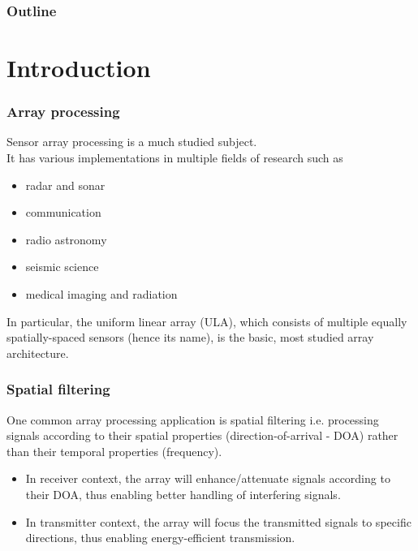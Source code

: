 \documentclass[10pt,pdflatex,headrule,landscape]{beamer}
\institute[SFU]{
Department of Electrical Engineering \\
Technion - Israel Institute of Technology \\
Technion City, Haifa 3200003, Israel
}
\date[]
\begin{document}
\begin{frame}
  \titlepage
\end{frame}

\begin{frame}
  \frametitle{Outline}
  \tableofcontents[hideallsubsections]
\end{frame}

\setlength{\parskip}{1em}

\section{Introduction}

\begin{frame}
\frametitle{Array processing}
Sensor array processing is a much studied subject.
\\
It has various implementations in multiple fields of research such as 
\begin{itemize}
 \item radar and sonar
 \item communication
 \item radio astronomy
 \item seismic science
 \item medical imaging and radiation
\end{itemize}
In particular, the uniform linear array (ULA), which consists of multiple equally spatially-spaced sensors (hence its name), is the basic, most studied array architecture.
\end{frame}

\begin{frame}
\frametitle{Spatial filtering}
One common array processing application is spatial filtering i.e. processing signals according to their spatial properties (direction-of-arrival - DOA) rather than their temporal properties (frequency).
\begin{itemize}
\item 
{
In receiver context, the array will enhance/attenuate signals according to their DOA, thus enabling better handling of interfering signals.
}
\item 
{
In transmitter context, the array will focus the transmitted signals to specific directions, thus enabling energy-efficient transmission.
}
\end{itemize}
\end{frame}
\end{document}
